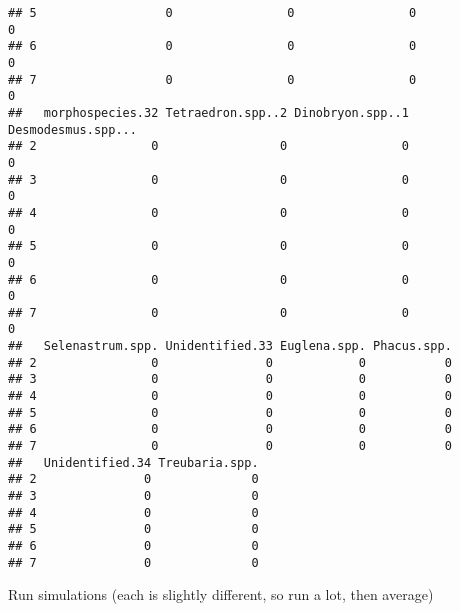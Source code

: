 \documentclass[]{article}
\begin{document}
\begin{verbatim}
## 5                  0                0                0                  0
## 6                  0                0                0                  0
## 7                  0                0                0                  0
##   morphospecies.32 Tetraedron.spp..2 Dinobryon.spp..1 Desmodesmus.spp...
## 2                0                 0                0                  0
## 3                0                 0                0                  0
## 4                0                 0                0                  0
## 5                0                 0                0                  0
## 6                0                 0                0                  0
## 7                0                 0                0                  0
##   Selenastrum.spp. Unidentified.33 Euglena.spp. Phacus.spp.
## 2                0               0            0           0
## 3                0               0            0           0
## 4                0               0            0           0
## 5                0               0            0           0
## 6                0               0            0           0
## 7                0               0            0           0
##   Unidentified.34 Treubaria.spp.
## 2               0              0
## 3               0              0
## 4               0              0
## 5               0              0
## 6               0              0
## 7               0              0
\end{verbatim}

Run simulations (each is slightly different, so run a lot, then average)
\end{document}
